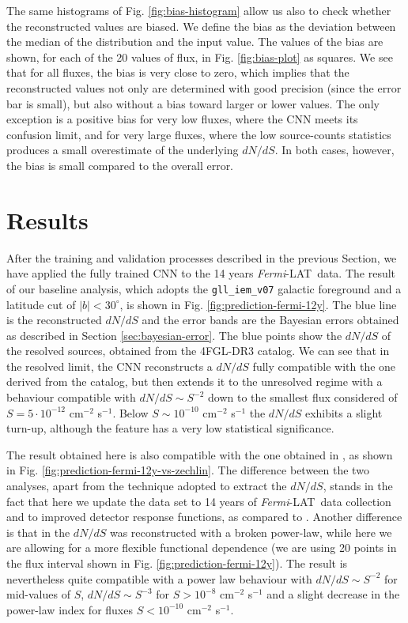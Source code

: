 \documentclass[a4paper,11pt]{article}
\newcommand{\fermi}{\textsl{Fermi}-LAT\ }
\newcommand{\dnds}{dN/dS }
\begin{document}
The same histograms of Fig. \ref{fig:bias-histogram} allow us also to check whether the reconstructed values are biased. We define the bias as the deviation between the median of the distribution and the input value. The values of the bias are shown, for each of the 20 values of flux, in Fig. \ref{fig:bias-plot} as squares. We see that for all fluxes, the bias is very close to zero, which implies that the reconstructed values not only are determined with good precision (since the error bar is small), but also without a  bias toward larger or lower values. The only exception is a positive bias for very low fluxes, where the CNN meets its confusion limit, and for very large fluxes, where the low source-counts statistics produces a small overestimate of the underlying $\dnds$.
In both cases, however, the bias is small compared to the overall error.


\section{Results}
\label{sec:results}

After the training and validation processes described in the previous Section, we have applied the fully trained CNN to the 14 years \fermi data. The result of our baseline analysis, which adopts the \verb|gll_iem_v07| galactic foreground and a latitude cut of $|b|<30^\circ$, is shown in Fig. \ref{fig:prediction-fermi-12y}. The blue line is the reconstructed $\dnds$ and the error bands are the Bayesian errors obtained as described in Section \ref{sec:bayesian-error}. The blue points show the $\dnds$ of the resolved sources, obtained from the 4FGL-DR3 catalog. We can see that in the resolved limit, the CNN reconstructs a $\dnds$ fully compatible with the one derived from the catalog, but then extends it to the unresolved regime with a behaviour compatible with $\dnds \sim S^{-2}$ down to the smallest flux considered of $S = 5 \cdot 10^{-12}$ cm$^{-2}$ s$^{-1}$.
Below $S \sim  10^{-10}$ cm$^{-2}$ s$^{-1}$ the $\dnds$ exhibits a slight turn-up, although the feature has a very low statistical significance.

The result obtained here is also compatible with the one obtained in \cite{Cuoco-1pdf}, as shown in Fig. \ref{fig:prediction-fermi-12y-vs-zechlin}. The difference between the two analyses, apart from the technique adopted to extract the $\dnds$, stands in the fact that here we update the data set to 14 years of \fermi data collection and to improved detector response functions, as compared to \cite{Cuoco-1pdf}. Another difference is that in \cite{Cuoco-1pdf} the  $\dnds$ was reconstructed with a broken power-law, while here we are allowing for a more flexible functional dependence (we are using 20 points in the flux interval shown in Fig. \ref{fig:prediction-fermi-12y}). The result is nevertheless quite compatible with a power law behaviour with $\dnds \sim S^{-2}$ for mid-values of $S$, $\dnds \sim S^{-3}$ for $S > 10^{-8}$ cm$^{-2}$ s$^{-1}$ and a slight decrease in the power-law index for fluxes $S < 10^{-10}$ cm$^{-2}$ s$^{-1}$. 
\end{document}
